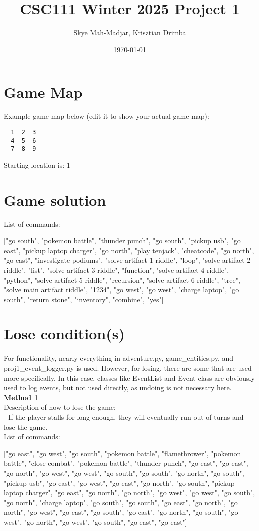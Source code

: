 \documentclass[11pt]{article}
\title{CSC111 Winter 2025 Project 1}
\author{Skye Mah-Madjar, Krisztian Drimba}
\date{\today}
\begin{document}
\maketitle

\section*{Game Map}
Example game map below (edit it to show your actual game map):

\begin{verbatim}
  1  2  3
  4  5  6
  7  8  9
\end{verbatim}

Starting location is: 1

\section*{Game solution}
List of commands: 

["go south", "pokemon battle", "thunder punch", "go south", "pickup usb", "go east", "pickup laptop charger", "go north", "play tenjack", "cheatcode", "go north", "go east", "investigate podiums", "solve artifact 1 riddle", "loop", "solve artifact 2 riddle", "list", "solve artifact 3 riddle", "function", "solve artifact 4 riddle", "python", "solve artifact 5 riddle", "recursion", "solve artifact 6 riddle", "tree", "solve main artifact riddle", "1234", "go west", "go west", "charge laptop", "go south", "return stone", "inventory", "combine", "yes"]

\section*{Lose condition(s)}
For functionality, nearly everything in adventure.py, game\_entities.py, and proj1\_event\_logger.py is used. However, for losing, there are some that are used more specifically. In this case, classes like EventList and Event class are obviously used to log events, but not used directly, as undoing is not necessary here. \\

\textbf{Method 1} \\
Description of how to lose the game: \\
- If the player stalls for long enough, they will eventually run out of turns and lose the game. \\
List of commands:

["go east", "go west", "go south", "pokemon battle", "flamethrower", "pokemon battle", "close combat",
                 "pokemon battle", "thunder punch", "go east", "go east", "go north", "go west", "go west", "go south",
                 "go south", "go north", "go south", "pickup usb", "go east", "go west", "go east", "go north",
                 "go south", "pickup laptop charger", "go east", "go north", "go north", "go west", "go west",
                 "go south", "go north", "charge laptop", "go south", "go south", "go east", "go north",
                 "go north", "go west", "go east", "go south", "go east", "go north", "go south", "go west",
                 "go north", "go west", "go south", "go east", "go east"]
\end{document}
